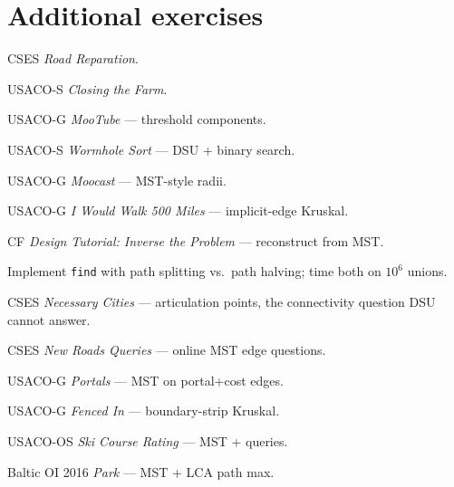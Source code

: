 \section{Additional exercises}
\begin{exercise}[easy] CSES \emph{Road Reparation}. \end{exercise}
\begin{exercise}[easy] USACO-S \emph{Closing the Farm}. \end{exercise}
\begin{exercise}[easy] USACO-G \emph{MooTube} --- threshold components. \end{exercise}
\begin{exercise}[medium] USACO-S \emph{Wormhole Sort} --- DSU + binary search. \end{exercise}
\begin{exercise}[medium] USACO-G \emph{Moocast} --- MST-style radii. \end{exercise}
\begin{exercise}[medium] USACO-G \emph{I Would Walk 500 Miles} --- implicit-edge Kruskal. \end{exercise}
\begin{exercise}[medium] CF \emph{Design Tutorial: Inverse the Problem} --- reconstruct from MST. \end{exercise}
\begin{exercise}[medium] Implement \texttt{find} with path splitting vs.\ path halving; time both on $10^6$ unions. \end{exercise}
\begin{exercise}[medium] CSES \emph{Necessary Cities} --- articulation points, the connectivity question DSU cannot answer. \end{exercise}
\begin{exercise}[hard] CSES \emph{New Roads Queries} --- online MST edge questions. \end{exercise}
\begin{exercise}[hard] USACO-G \emph{Portals} --- MST on portal+cost edges. \end{exercise}
\begin{exercise}[hard] USACO-G \emph{Fenced In} --- boundary-strip Kruskal. \end{exercise}
\begin{exercise}[hard] USACO-OS \emph{Ski Course Rating} --- MST + queries. \end{exercise}
\begin{exercise}[hard] Baltic OI 2016 \emph{Park} --- MST + LCA path max. \end{exercise}


